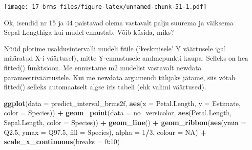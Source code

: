\documentclass[]{book}
\newenvironment{Shaded}{\begin{snugshade}}{\end{snugshade}}
\newcommand{\KeywordTok}[1]{\textcolor[rgb]{0.13,0.29,0.53}{\textbf{#1}}}
\newcommand{\DataTypeTok}[1]{\textcolor[rgb]{0.13,0.29,0.53}{#1}}
\newcommand{\DecValTok}[1]{\textcolor[rgb]{0.00,0.00,0.81}{#1}}
\newcommand{\StringTok}[1]{\textcolor[rgb]{0.31,0.60,0.02}{#1}}
\newcommand{\CommentTok}[1]{\textcolor[rgb]{0.56,0.35,0.01}{\textit{#1}}}
\newcommand{\OtherTok}[1]{\textcolor[rgb]{0.56,0.35,0.01}{#1}}
\newcommand{\OperatorTok}[1]{\textcolor[rgb]{0.81,0.36,0.00}{\textbf{#1}}}
\newcommand{\NormalTok}[1]{#1}
\begin{document}
\texttt{[image: 17\_brms\_files/figure-latex/unnamed-chunk-51-1.pdf]}

Ok, isendid nr 15 ja 44 paistavad olema vastavalt palju suurema ja
väiksema Sepal Lengthiga kui mudel ennustab. Võib küsida, miks?

Nüüd plotime usaldusintervalli mudeli fitile (`keskmisele' Y väärtusele
igal määratud X-i väärtusel), mitte Y-ennustusele andmepunkti kaupa.
Selleks on hea fitted() funktsioon. Me ennustame m2 mudelist vastavalt
newdata parameetriväärtustele. Kui me newdata argumendi tühjaks jätame,
siis võtab fitted() selleks automaatselt algse iris tabeli (ehk valimi
väärtused).

\begin{Shaded}
\end{Shaded}

\begin{Shaded}
\begin{Highlighting}[]
\KeywordTok{ggplot}\NormalTok{(}\DataTypeTok{data =}\NormalTok{ predict_interval_brms2f, }\KeywordTok{aes}\NormalTok{(}\DataTypeTok{x =}\NormalTok{ Petal.Length, }\DataTypeTok{y =}\NormalTok{ Estimate, }\DataTypeTok{color =}\NormalTok{ Species)) }\OperatorTok{+}
\StringTok{  }\KeywordTok{geom_point}\NormalTok{(}\DataTypeTok{data =}\NormalTok{ no_versicolor, }\KeywordTok{aes}\NormalTok{(Petal.Length, Sepal.Length, }\DataTypeTok{color =}\NormalTok{ Species)) }\OperatorTok{+}
\StringTok{  }\KeywordTok{geom_line}\NormalTok{() }\OperatorTok{+}
\StringTok{  }\KeywordTok{geom_ribbon}\NormalTok{(}\KeywordTok{aes}\NormalTok{(}\DataTypeTok{ymin =}\NormalTok{ Q2.}\DecValTok{5}\NormalTok{, }\DataTypeTok{ymax =}\NormalTok{ Q97.}\DecValTok{5}\NormalTok{, }\DataTypeTok{fill =}\NormalTok{ Species), }\DataTypeTok{alpha =} \DecValTok{1}\OperatorTok{/}\DecValTok{3}\NormalTok{, }\DataTypeTok{colour =} \OtherTok{NA}\NormalTok{) }\OperatorTok{+}
\StringTok{  }\KeywordTok{scale_x_continuous}\NormalTok{(}\DataTypeTok{breaks =} \DecValTok{0}\OperatorTok{:}\DecValTok{10}\NormalTok{)}
\end{Highlighting}
\end{Shaded}
\end{document}
